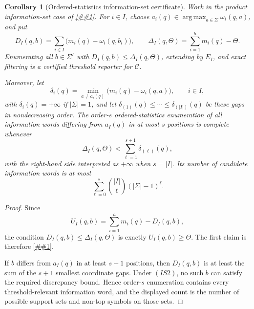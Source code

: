 \documentclass[10pt]{article}
\newcommand{\cref}[1]{\ref{##1}}
\newtheorem{corollary}[theorem]{Corollary}
\theoremstyle{definition}
\begin{document}
\begin{corollary}[Ordered-statistics information-set certificate]
   \label{cor:ordered-statistics-information-set}
   Work in the product information-set case of
   \cref{lem:information-set-threshold-reporter}.  For \(i\in I\), choose
   \(a_i(q)\in\operatorname*{arg\,max}_{a\in\Sigma}\omega_i(q,a)\), and put
   \[
      D_I(q,b)=
      \sum_{i\in I}
      \bigl(m_i(q)-\omega_i(q,b_i)\bigr),
      \qquad
      \Delta_I(q,\Theta)=
      \sum_{i=1}^h m_i(q)-\Theta .
   \]
   Enumerating all \(b\in\Sigma^I\) with
   \(D_I(q,b)\le\Delta_I(q,\Theta)\), extending by \(E_I\), and exact filtering
   is a certified threshold reporter for \(\mathcal C\).

   Moreover, let
   \[
      \delta_i(q)=
      \min_{a\ne a_i(q)}
      \bigl(m_i(q)-\omega_i(q,a)\bigr),
      \qquad i\in I,
   \]
   with \(\delta_i(q)=+\infty\) if \(|\Sigma|=1\), and let
   \(\delta_{(1)}(q)\le\cdots\le\delta_{(|I|)}(q)\) be these gaps in
   nondecreasing order.  The order-\(s\) ordered-statistics enumeration of all
   information words differing from \(a_I(q)\) in at most \(s\) positions is
   complete whenever
   \[
      \Delta_I(q,\Theta)
      <
      \sum_{\ell=1}^{s+1}\delta_{(\ell)}(q),
      \tag{IS2}
   \]
   with the right-hand side interpreted as \(+\infty\) when \(s=|I|\).  Its
   number of candidate information words is at most
   \[
      \sum_{\ell=0}^s \binom{|I|}{\ell}(|\Sigma|-1)^\ell .
   \]
\end{corollary}

\begin{proof}
   Since
   \[
      U_I(q,b)
      =
      \sum_{i=1}^h m_i(q)-D_I(q,b),
   \]
   the condition \(D_I(q,b)\le\Delta_I(q,\Theta)\) is exactly
   \(U_I(q,b)\ge\Theta\).  The first claim is therefore
   \cref{lem:information-set-threshold-reporter}.

   If \(b\) differs from \(a_I(q)\) in at least \(s+1\) positions, then
   \(D_I(q,b)\) is at least the sum of the \(s+1\) smallest coordinate gaps.
   Under \((IS2)\), no such \(b\) can satisfy the required discrepancy bound.
   Hence order-\(s\) enumeration contains every threshold-relevant information
   word, and the displayed count is the number of possible support sets and
   non-top symbols on those sets.
\end{proof}
\end{document}
